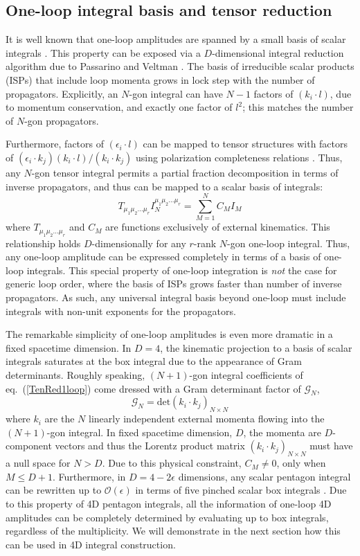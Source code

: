 \documentclass[12pt,letter]{article}
\def\eqn#1{eq.~(\ref{#1})}
\def\be{\begin{equation}}
\def\ee{\end{equation}}
\begin{document}
\subsection{One-loop integral basis and tensor reduction}
\label{sec:1loopMethods}


It is well known that one-loop amplitudes are spanned by a small basis of scalar integrals \cite{Forde:2007mi,Badger:2008cm,ElvangHuangReview}. This property can be exposed via a $D$-dimensional integral reduction algorithm due to Passarino and Veltman \cite{Passarino:1978jh}. The basis of irreducible scalar products (ISPs) that include loop momenta grows in lock step with the number of propagators. Explicitly, an $N$-gon integral can have $N-1$ factors of $(k_i\cdot l)$, due to momentum conservation, and exactly one factor of $l^2$; this matches the number of $N$-gon propagators. 

Furthermore, factors of $(\epsilon_i\cdot l)$ can be mapped to tensor structures with factors of $(\epsilon_i \cdot k_j)(k_i  \cdot l)/(k_i \cdot k_j)$ using polarization completeness relations \cite{Bern:2017tuc}. Thus, any $N$-gon tensor integral permits a partial fraction decomposition in terms of inverse propagators, and thus can be mapped to a scalar basis of integrals:
\be\label{TenRed1loop}
T_{\mu_1\mu_2...\mu_r} I_N^{\mu_1\mu_2...\mu_r} = \sum_{M=1}^N C_M I_M
\ee
where $T_{\mu_1\mu_2...\mu_r}$ and $C_M$ are functions exclusively of external kinematics. This relationship holds $D$-dimensionally for any $r$-rank $N$-gon one-loop integral. Thus, any one-loop amplitude can be expressed completely in terms of a basis of one-loop integrals. This special property of one-loop integration is \textit{not} the case for generic loop order, where the basis of ISPs grows faster than number of inverse propagators. As such, any universal integral basis beyond one-loop must include integrals with non-unit exponents for the propagators.  

The remarkable simplicity of one-loop amplitudes is even more dramatic in a fixed spacetime dimension. In $D=4$, the kinematic projection to a basis of scalar integrals saturates at the box integral due to the appearance of Gram determinants. Roughly speaking, $(N+1)$-gon integral coefficients of \eqn{TenRed1loop} come dressed with a Gram determinant factor of $\mathcal{G}_N$,
\be
\mathcal{G}_N = \text{det} (k_i \cdot k_j)_{\!N\!\times\! N}
\ee
where $k_i$ are the $N$ linearly independent external momenta flowing into the $(N+1)$-gon integral. In fixed spacetime dimension, $D$, the momenta are $D$-component vectors and thus the Lorentz product matrix $(k_i \cdot k_j)_{\!N\!\times\! N}$ must have a null space for $N>D$. Due to this physical constraint, $C_M \neq 0$, only when $M\leq D+1$. Furthermore, in $D=4-2\epsilon$ dimensions, any scalar pentagon integral can be rewritten up to $\mathcal{O}(\epsilon)$ in terms of five pinched scalar box integrals \cite{Bern:1993kr}. Due to this property of 4D pentagon integrals, all the information of one-loop 4D amplitudes can be completely determined by evaluating up to box integrals, regardless of the multiplicity. We will demonstrate in the next section how this can be used in 4D integral construction. 
\end{document}
